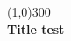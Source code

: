 \documentclass{article}
\begin{document}




	\begin{titlepage}
		\begin{center}
			\line(1,0){300}\\
			\huge{\bfseries Title test}\\
			
		\end{center}
	\end{titlepage}
\end{document}
